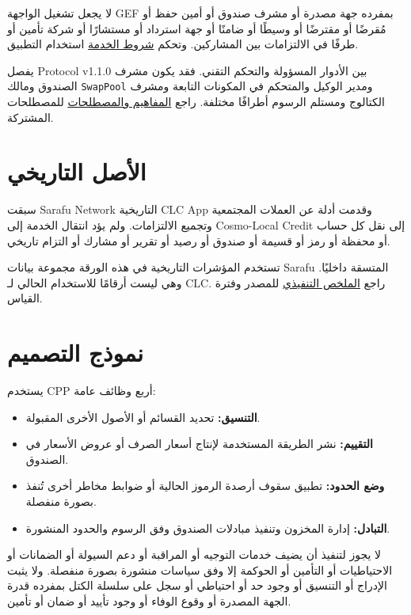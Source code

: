 \documentclass[11pt]{article}
\begin{document}
لا يجعل تشغيل الواجهة GEF بمفرده جهة مصدرة أو مشرف صندوق أو أمين حفظ أو مُقرضًا أو مقترضًا أو وسيطًا أو ضامنًا أو جهة استرداد أو مستشارًا أو شركة تأمين أو طرفًا في الالتزامات بين المشاركين. وتحكم \href{https://docs.cosmolocal.credit/ar/governance/terms}{شروط الخدمة} استخدام التطبيق.

يفصل Protocol v1.1.0 بين الأدوار المسؤولة والتحكم التقني. فقد يكون مشرف الصندوق ومالك \texttt{SwapPool} ومدير الوكيل والمتحكم في المكونات التابعة ومشرف الكتالوج ومستلم الرسوم أطرافًا مختلفة. راجع \href{https://docs.cosmolocal.credit/ar/introduction/concepts}{المفاهيم والمصطلحات} للمصطلحات المشتركة.

\section*{الأصل التاريخي}

سبقت Sarafu Network التاريخية CLC App وقدمت أدلة عن العملات المجتمعية وتجميع الالتزامات. ولم يؤد انتقال الخدمة إلى Cosmo-Local Credit إلى نقل كل حساب أو محفظة أو رمز أو قسيمة أو صندوق أو رصيد أو تقرير أو مشارك أو التزام تاريخي.

تستخدم المؤشرات التاريخية في هذه الورقة مجموعة بيانات Sarafu المتسقة داخليًا. وهي ليست أرقامًا للاستخدام الحالي لـ CLC. راجع \href{https://docs.cosmolocal.credit/ar/white-paper/executive-summary}{الملخص التنفيذي} للمصدر وفترة القياس.

\section*{نموذج التصميم}

يستخدم CPP أربع وظائف عامة:

\begin{itemize}[leftmargin=*]
\item \textbf{التنسيق:} تحديد القسائم أو الأصول الأخرى المقبولة.
\item \textbf{التقييم:} نشر الطريقة المستخدمة لإنتاج أسعار الصرف أو عروض الأسعار في الصندوق.
\item \textbf{وضع الحدود:} تطبيق سقوف أرصدة الرموز الحالية أو ضوابط مخاطر أخرى تُنفذ بصورة منفصلة.
\item \textbf{التبادل:} إدارة المخزون وتنفيذ مبادلات الصندوق وفق الرسوم والحدود المنشورة.
\end{itemize}
لا يجوز لتنفيذ أن يضيف خدمات التوجيه أو المراقبة أو دعم السيولة أو الضمانات أو الاحتياطيات أو التأمين أو الحوكمة إلا وفق سياسات منشورة بصورة منفصلة. ولا يثبت الإدراج أو التنسيق أو وجود حد أو احتياطي أو سجل على سلسلة الكتل بمفرده قدرة الجهة المصدرة أو وقوع الوفاء أو وجود تأييد أو ضمان أو تأمين.
\end{document}
